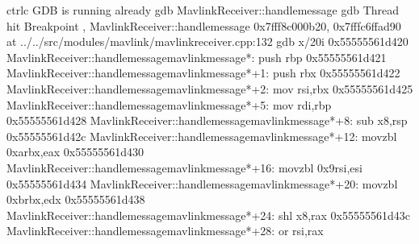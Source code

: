 \documentclass[letterpaper,10pt,english]{sphinxmanual}
\begin{document}
\begin{sphinxVerbatim}[commandchars=\\\{\}]
\PYGZlt{}ctrl\PYGZhy{}c\PYGZgt{}  GDB is running already
gdb  MavlinkReceiver::handle\PYGZus{}message
gdb 
Thread   hit Breakpoint , MavlinkReceiver::handle\PYGZus{}message 0x7fff8c000b20, 0x7fffc6ffad90
 at ../../src/modules/mavlink/mavlink\PYGZus{}receiver.cpp:132
      
gdb x/20i 
\PYGZgt{} 0x55555561d420 \PYGZlt{}MavlinkReceiver::handle\PYGZus{}message\PYGZus{}\PYGZus{}mavlink\PYGZus{}message*\PYGZgt{}:        push   \PYGZpc{}rbp
   0x55555561d421 \PYGZlt{}MavlinkReceiver::handle\PYGZus{}message\PYGZus{}\PYGZus{}mavlink\PYGZus{}message*+1\PYGZgt{}:      push   \PYGZpc{}rbx
   0x55555561d422 \PYGZlt{}MavlinkReceiver::handle\PYGZus{}message\PYGZus{}\PYGZus{}mavlink\PYGZus{}message*+2\PYGZgt{}:      mov    \PYGZpc{}rsi,\PYGZpc{}rbx
   0x55555561d425 \PYGZlt{}MavlinkReceiver::handle\PYGZus{}message\PYGZus{}\PYGZus{}mavlink\PYGZus{}message*+5\PYGZgt{}:      mov    \PYGZpc{}rdi,\PYGZpc{}rbp
   0x55555561d428 \PYGZlt{}MavlinkReceiver::handle\PYGZus{}message\PYGZus{}\PYGZus{}mavlink\PYGZus{}message*+8\PYGZgt{}:      sub    x8,\PYGZpc{}rsp
   0x55555561d42c \PYGZlt{}MavlinkReceiver::handle\PYGZus{}message\PYGZus{}\PYGZus{}mavlink\PYGZus{}message*+12\PYGZgt{}:     movzbl 0xa\PYGZpc{}rbx,\PYGZpc{}eax
   0x55555561d430 \PYGZlt{}MavlinkReceiver::handle\PYGZus{}message\PYGZus{}\PYGZus{}mavlink\PYGZus{}message*+16\PYGZgt{}:     movzbl 0x9\PYGZpc{}rsi,\PYGZpc{}esi
   0x55555561d434 \PYGZlt{}MavlinkReceiver::handle\PYGZus{}message\PYGZus{}\PYGZus{}mavlink\PYGZus{}message*+20\PYGZgt{}:     movzbl 0xb\PYGZpc{}rbx,\PYGZpc{}edx
   0x55555561d438 \PYGZlt{}MavlinkReceiver::handle\PYGZus{}message\PYGZus{}\PYGZus{}mavlink\PYGZus{}message*+24\PYGZgt{}:     shl    x8,\PYGZpc{}rax
   0x55555561d43c \PYGZlt{}MavlinkReceiver::handle\PYGZus{}message\PYGZus{}\PYGZus{}mavlink\PYGZus{}message*+28\PYGZgt{}:     or     \PYGZpc{}rsi,\PYGZpc{}rax

\end{sphinxVerbatim}
\end{document}
